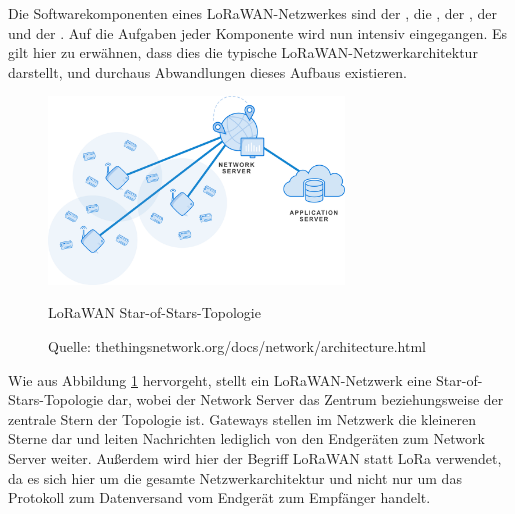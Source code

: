 Die Softwarekomponenten eines LoRaWAN-Netzwerkes sind der , die , der , der  und der . Auf die Aufgaben jeder Komponente wird nun intensiv eingegangen. Es gilt hier zu erwähnen, dass dies die typische LoRaWAN-Netzwerkarchitektur darstellt, und durchaus Abwandlungen dieses Aufbaus existieren. 

\begin{figure}[H]
  \vspace{10pt}
  \begin{center}
    \includegraphics[width=0.7\textwidth]{./images/ttn-arch-star.jpg}
  \end{center}
  \vspace{-5pt}
  \caption[LoRaWAN Star-of-Stars-Topologie]{LoRaWAN Star-of-Stars-Topologie}
  \caption*{Quelle: {thethingsnetwork.org/docs/network/architecture.html}}
  \label{fig:ttn-arch-star}
  \vspace{-10pt}
\end{figure}

Wie aus Abbildung \ref{fig:ttn-arch-star} hervorgeht, stellt ein LoRaWAN-Netzwerk eine Star-of-Stars-Topologie dar, wobei der Network Server das Zentrum beziehungsweise der zentrale Stern der Topologie ist. Gateways stellen im Netzwerk die kleineren Sterne dar und leiten Nachrichten lediglich von den Endgeräten zum Network Server weiter. Außerdem wird hier der Begriff LoRaWAN statt LoRa verwendet, da es sich hier um die gesamte Netzwerkarchitektur und nicht nur um das Protokoll zum Datenversand vom Endgerät zum Empfänger handelt.

